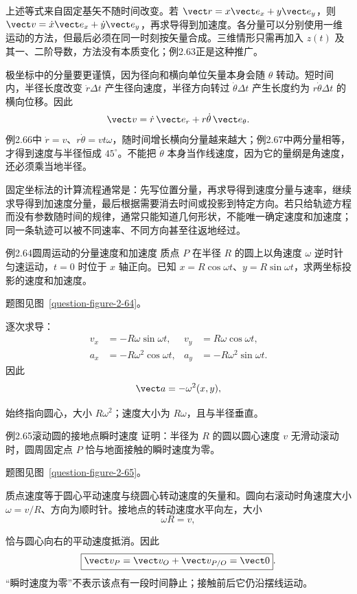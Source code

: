 上述等式来自固定基矢不随时间改变。若 $\vect r=x\vect e_x+y\vect e_y$，则 $\vect v=\dot x\vect e_x+\dot y\vect e_y$，再求导得到加速度。各分量可以分别使用一维运动的方法，但最后必须在同一时刻按矢量合成。三维情形只需再加入 $z(t)$ 及其一、二阶导数，方法没有本质变化；例2.63正是这种推广。

极坐标中的分量要更谨慎，因为径向和横向单位矢量本身会随 $\theta$ 转动。短时间内，半径长度改变 $\dot r\Delta t$ 产生径向速度，半径方向转过 $\dot\theta\Delta t$ 产生长度约为 $r\dot\theta\Delta t$ 的横向位移。因此
\begin{equation}
 \vect v=\dot r\,\vect e_r+r\dot\theta\,\vect e_\theta.
\end{equation}
例2.66中 $\dot r=v$、$r\dot\theta=vt\omega$，随时间增长横向分量越来越大；例2.67中两分量相等，才得到速度与半径恒成 $45^\circ$。不能把 $\dot\theta$ 本身当作线速度，因为它的量纲是角速度，还必须乘当地半径。

固定坐标法的计算流程通常是：先写位置分量，再求导得到速度分量与速率，继续求导得到加速度分量，最后根据需要消去时间或投影到特定方向。若只给轨迹方程而没有参数随时间的规律，通常只能知道几何形状，不能唯一确定速度和加速度；同一条轨迹可以被不同速率、不同方向甚至往返地经过。

\ifdefined\Needspace{}\fi
\begin{origexamplebox}{例2.64\quad 圆周运动的分量速度和加速度}
质点 $P$ 在半径 $R$ 的圆上以角速度 $\omega$ 逆时针匀速运动，$t=0$ 时位于 $x$ 轴正向。已知 $x=R\cos\omega t$、$y=R\sin\omega t$，求两坐标投影的速度和加速度。
\par 题图见图~\ref{question-figure-2-64}。
\KQuestionCM
\end{origexamplebox}
\begin{xesolution}
逐次求导：
\begin{align*}
v_x&=-R\omega\sin\omega t,&v_y&=R\omega\cos\omega t,\\
a_x&=-R\omega^2\cos\omega t,&a_y&=-R\omega^2\sin\omega t.
\end{align*}
因此
\[
\vect a=-\omega^2(x,y),
\]
\CircleComponentsDiagram

始终指向圆心，大小 $R\omega^2$；速度大小为 $R\omega$，且与半径垂直。
\end{xesolution}

\begin{origexamplebox}{例2.65\quad 滚动圆的接地点瞬时速度}
证明：半径为 $R$ 的圆以圆心速度 $v$ 无滑动滚动时，圆周固定点 $P$ 恰与地面接触的瞬时速度为零。
\par 题图见图~\ref{question-figure-2-65}。
\KQuestionCN
\end{origexamplebox}
\begin{xesolution}
质点速度等于圆心平动速度与绕圆心转动速度的矢量和。圆向右滚动时角速度大小 $\omega=v/R$、方向为顺时针。接地点的转动速度水平向左，大小
\[
\omega R=v,
\]
\RollingContactDiagram

恰与圆心向右的平动速度抵消。因此
\[
 \boxed{\vect v_P=\vect v_O+\vect v_{P/O}=\vect0}.
\]
“瞬时速度为零”不表示该点有一段时间静止；接触前后它仍沿摆线运动。
\end{xesolution}

